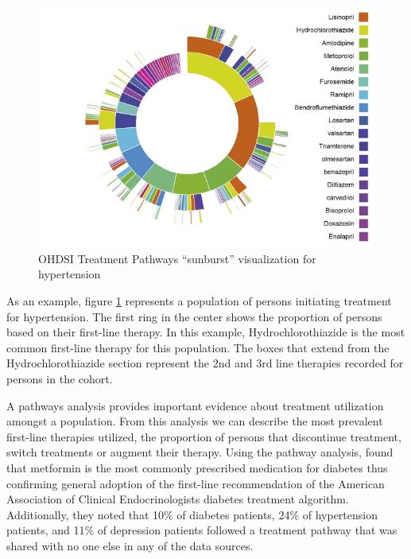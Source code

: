 \documentclass[11pt]{book}
\theoremstyle{definition}
\theoremstyle{definition}
\theoremstyle{definition}
\theoremstyle{remark}
\begin{document}
\begin{figure}

{\centering \includegraphics[width=0.9\linewidth]{images/Characterization/pnasTreatmentPathwaysSunburst} 

}

\caption{OHDSI Treatment Pathways “sunburst” visualization for hypertension}\label{fig:treatmentPathwaysSunburstDataViz}
\end{figure}

As an example, figure \ref{fig:treatmentPathwaysSunburstDataViz} represents a population of persons initiating treatment for hypertension. The first ring in the center shows the proportion of persons based on their first-line therapy. In this example, Hydrochlorothiazide is the most common first-line therapy for this population. The boxes that extend from the Hydrochlorothiazide section represent the 2nd and 3rd line therapies recorded for persons in the cohort.

A pathways analysis provides important evidence about treatment utilization amongst a population. From this analysis we can describe the most prevalent first-line therapies utilized, the proportion of persons that discontinue treatment, switch treatments or augment their therapy. Using the pathway analysis, \citet{Hripcsak7329} found that metformin is the most commonly prescribed medication for diabetes thus confirming general adoption of the first-line recommendation of the American Association of Clinical Endocrinologists diabetes treatment algorithm. Additionally, they noted that 10\% of diabetes patients, 24\% of hypertension patients, and 11\% of depression patients followed a treatment pathway that was shared with no one else in any of the data sources.
\end{document}
